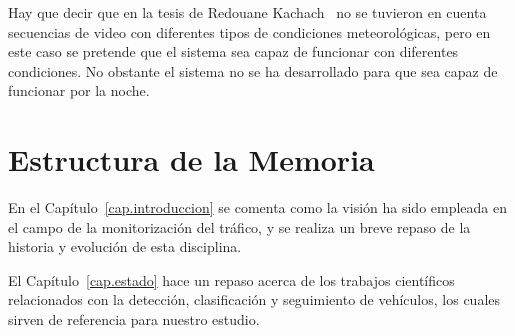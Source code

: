 Hay que decir que en la tesis de Redouane Kachach~\cite{redo_tesis} no se tuvieron en cuenta secuencias de video con diferentes tipos de condiciones meteorológicas, pero en este caso se pretende que el sistema sea capaz de funcionar con diferentes condiciones.  No obstante el sistema no se ha desarrollado para que sea capaz de funcionar por la noche.

\section{Estructura de la Memoria}

En el Capítulo~\ref{cap.introduccion} se comenta como la visión ha sido empleada en el campo de la monitorización del tráfico, y se realiza un breve repaso de la historia y evolución de esta disciplina.

El Capítulo~\ref{cap.estado} hace un repaso acerca de los trabajos científicos relacionados con la detección, clasificación y seguimiento de vehículos, los cuales sirven de referencia para nuestro estudio.
